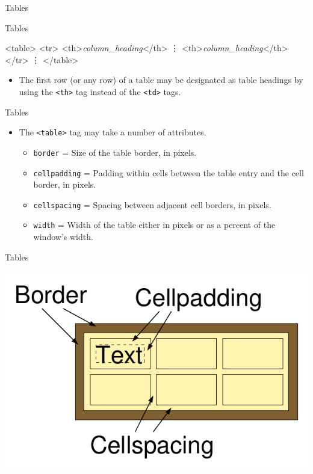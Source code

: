 \documentclass[svgnames]{beamer}
\begin{document}
\begin{frame}[fragile]{Tables}
\small
\begin{block}{Tables}
\begin{semiverbatim}
<table>
    <tr>
        <th>\textit{column\_heading}</th>
            \vdots
        <th>\textit{column\_heading}</th>
    </tr>
        \vdots
</table>
\end{semiverbatim}
\end{block}
\normalsize
\begin{itemize}
	\item The first row (or any row) of a table may be designated as table headings by using the \texttt{<th>} tag instead of the \texttt{<td>} tags.
\end{itemize}
\end{frame}

\begin{frame}{Tables}
\begin{itemize}
	\item The \texttt{<table>} tag may take a number of attributes.
	\begin{itemize}
		\item \texttt{border} = Size of the table border, in pixels.
		\item \texttt{cellpadding} = Padding within cells between the table entry and the cell border, in pixels.
		\item \texttt{cellspacing} = Spacing between adjacent cell borders, in pixels.
		\item \texttt{width} = Width of the table either in pixels or as a percent of the window's width.
	\end{itemize}
\end{itemize}
\end{frame}

\begin{frame}{Tables}
\begin{center}\includegraphics[scale=0.60]{Fig-1.pdf}\end{center}
\end{frame}


\end{document}
